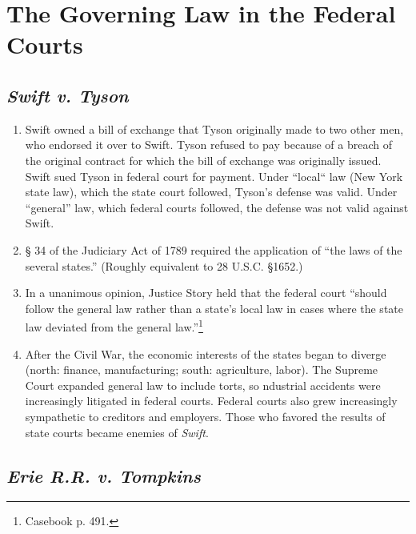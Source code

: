 \section{The Governing Law in the Federal Courts}

\subsection{\emph{Swift v. Tyson}}

\begin{enumerate}
    \item Swift owned a bill of exchange that Tyson originally made to two 
    other men, who endorsed it over to Swift. Tyson refused to pay because of 
    a breach of the original contract for which the bill of exchange was 
    originally issued. Swift sued Tyson in federal court for payment. Under 
    ``local`` law (New York state law), which the state court followed, 
    Tyson's defense was valid. Under ``general'' law, which federal courts 
    followed, the defense was not valid against Swift.
    \item § 34 of the Judiciary Act of 1789 required the application of ``the 
    laws of the several states.'' (Roughly equivalent to 28 U.S.C. §1652.)
    \item In a unanimous opinion, Justice Story held that the federal court 
    ``should follow the general law rather than a state's local law in cases 
    where the state law deviated from the general law.''\footnote{Casebook p. 
    491.}
    \item After the Civil War, the economic interests of the states began to 
    diverge (north: finance, manufacturing; south: agriculture, labor). The 
    Supreme Court expanded general law to include torts, so ndustrial 
    accidents were increasingly litigated in federal courts. Federal courts 
    also grew increasingly sympathetic to creditors and employers. Those who 
    favored the results of state courts became enemies of \emph{Swift}.
\end{enumerate}

\subsection{\emph{Erie R.R. v. Tompkins}}

